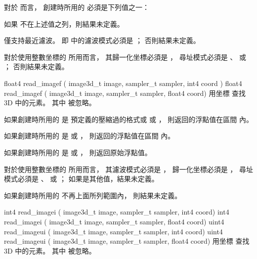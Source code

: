 對於  而言，
創建時所用的  必須是下列值之一：
\startigBase[indentnext=no]
\item {}
\item {}
\item {}
\stopigBase
如果  不在上述值之列，則結果未定義。

 僅支持最近濾波。
即  中的濾波模式必須是 ；
否則結果未定義。

對於使用整數坐標的  所用而言，
其歸一化坐標必須是 ，
尋址模式必須是 、 
 或 ；
否則結果未定義。
\stopbuffer

float4 read_imagef (
	image3d_t image,
	sampler_t sampler,
	int4 coord )
float4 read_imagef (
	image3d_t image,
	sampler_t sampler,
	float4 coord)
\stopbuffer
{}
用坐標 
 查找 3D   中的元素。
其中  被忽略。

如果創建時所用的  是
預定義的壓縮過的格式或  或 ，
則返回的浮點值在區間 \math{[0.0 \cdots 1.0]} 內。

如果創建時所用的  是
  或 ，
則返回的浮點值在區間 \math{[-1.0 \cdots 1.0]} 內。

如果創建時所用的  是
  或 ，
則返回原始浮點值。

對於使用整數坐標的  所用而言，
其濾波模式必須是 ，
歸一化坐標必須是 ，
尋址模式必須是 、 
 或 ；
如果是其他值，結果未定義。

如果創建時所用的  不再上面所列範圍內，
則結果未定義。
\stopbuffer

int4 read_imagei (
	image3d_t image,
	sampler_t sampler,
	int4 coord)
int4 read_imagei (
	image3d_t image,
	sampler_t sampler,
	float4 coord)
uint4 read_imageui (
	image3d_t image,
	sampler_t sampler,
	int4 coord)
uint4 read_imageui (
	image3d_t image,
	sampler_t sampler,
	float4 coord)
\stopbuffer
{}
用坐標  查找
 3D   中的元素。
其中  被忽略。

